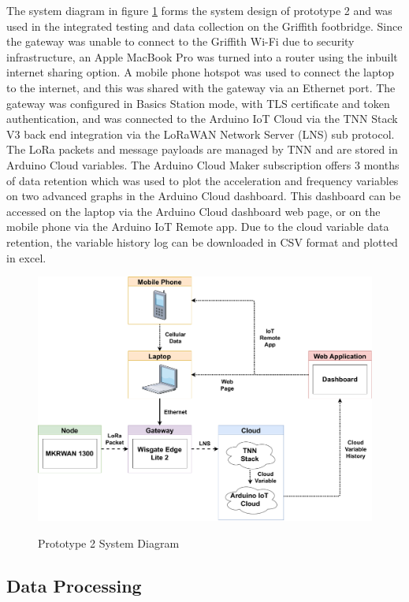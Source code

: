 The system diagram in figure \ref{proto2-sys-diagram} forms the system design of prototype 2 and was used in the integrated testing and data collection on the Griffith footbridge. Since the gateway was unable to connect to the Griffith Wi-Fi due to security infrastructure, an Apple MacBook Pro was turned into a router using the inbuilt internet sharing option. A mobile phone hotspot was used to connect the laptop to the internet, and this was shared with the gateway via an Ethernet port. The gateway was configured in Basics Station mode, with TLS certificate and token authentication, and was connected to the Arduino IoT Cloud via the TNN Stack V3 back end integration via the LoRaWAN Network Server (LNS) sub protocol. The LoRa packets and message payloads are managed by TNN and are stored in Arduino Cloud variables. The Arduino Cloud Maker subscription offers 3 months of data retention which was used to plot the acceleration and frequency variables on two advanced graphs in the Arduino Cloud dashboard. This dashboard can be accessed on the laptop via the Arduino Cloud dashboard web page, or on the mobile phone via the Arduino IoT Remote app. Due to the cloud variable data retention, the variable history log can be downloaded in CSV format and plotted in excel. 

\begin{figure}[H]
	\centering
	\caption{Prototype 2 System Diagram}
	\includegraphics[width=\textwidth]{Sections/Design-Process/proto2-sys-diagram.pdf}
	\label{proto2-sys-diagram}
\end{figure}

\subsection{Data Processing}
